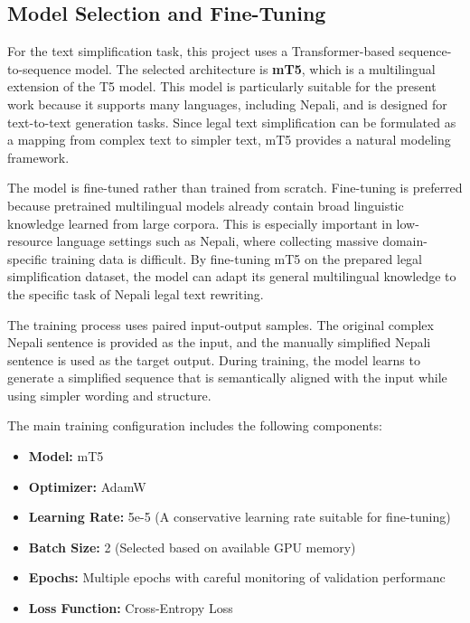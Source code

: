 \documentclass[12pt]{report}
\begin{document}


\subsection{Model Selection and Fine-Tuning}

For the text simplification task, this project uses a Transformer-based sequence-to-sequence model. The selected architecture is \textbf{mT5}, which is a multilingual extension of the T5 model. This model is particularly suitable for the present work because it supports many languages, including Nepali, and is designed for text-to-text generation tasks. Since legal text simplification can be formulated as a mapping from complex text to simpler text, mT5 provides a natural modeling framework.

The model is fine-tuned rather than trained from scratch. Fine-tuning is preferred because pretrained multilingual models already contain broad linguistic knowledge learned from large corpora. This is especially important in low-resource language settings such as Nepali, where collecting massive domain-specific training data is difficult. By fine-tuning mT5 on the prepared legal simplification dataset, the model can adapt its general multilingual knowledge to the specific task of Nepali legal text rewriting.

The training process uses paired input-output samples. The original complex Nepali sentence is provided as the input, and the manually simplified Nepali sentence is used as the target output. During training, the model learns to generate a simplified sequence that is semantically aligned with the input while using simpler wording and structure.

The main training configuration includes the following components:

\begin{itemize}
    \item \textbf{Model:} mT5
    \item \textbf{Optimizer:} AdamW
    \item \textbf{Learning Rate:} 5e-5 (A conservative learning rate suitable for fine-tuning)
    \item \textbf{Batch Size:} 2  (Selected based on available GPU memory)
    \item \textbf{Epochs:} Multiple epochs with careful monitoring of validation performanc
    \item \textbf{Loss Function:} Cross-Entropy Loss
\end{itemize}
\end{document}
